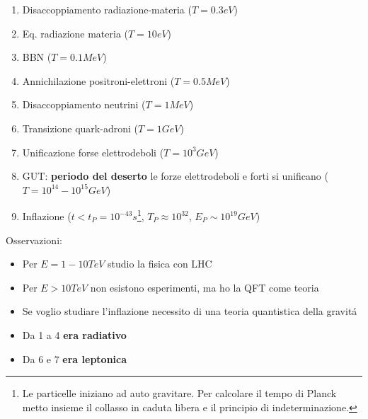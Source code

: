\documentclass[12pt, a4paper]{article}
\begin{document}
\begin{enumerate}
\item Disaccoppiamento radiazione-materia ($T=0.3 eV$)
\item Eq. radiazione materia ($T=10 eV$)
\item BBN ($T=0.1 MeV$)
\item Annichilazione positroni-elettroni ($T=0.5 MeV$)
\item Disaccoppiamento neutrini  ($T=1 MeV$)
\item Transizione quark-adroni  ($T=1 GeV$)
\item Unificazione forse elettrodeboli  ($T=10^3 GeV$)
\item GUT: \textbf{periodo del deserto} le forze elettrodeboli e forti si unificano  ($T=10^{14}-10^{15} GeV$)
\item Inflazione ($t<t_P=10^{-43}s$\footnote{Le particelle iniziano ad auto gravitare. Per calcolare il tempo di Planck metto insieme il collasso in caduta libera e il principio di indeterminazione. }, $T_P\approx 10^{32}$, $E_P\sim 10^{19}GeV$)
\end{enumerate}
Osservazioni:
\begin{itemize}
\item Per $E =1-10 TeV$ studio la fisica con LHC
\item  Per $E >10 TeV$ non esistono esperimenti, ma ho la QFT come teoria
\item Se voglio studiare l'inflazione necessito di una teoria quantistica della gravit\'{a}
\item Da 1 a 4 \textbf{era radiativo}
\item Da 6 e 7 \textbf{era leptonica}
\end{itemize}
\end{document}
